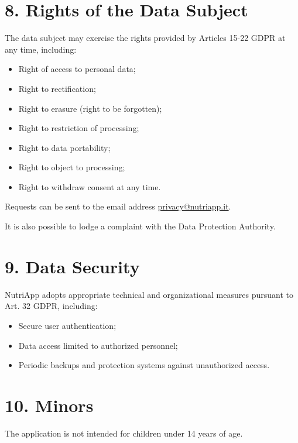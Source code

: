 \documentclass[a4paper,12pt]{article}
\begin{document}
    \section*{8. Rights of the Data Subject}

    The data subject may exercise the rights provided by Articles 15-22 GDPR at any time, including:

    \begin{itemize}
        \item Right of access to personal data;
        \item Right to rectification;
        \item Right to erasure (right to be forgotten);
        \item Right to restriction of processing;
        \item Right to data portability;
        \item Right to object to processing;
        \item Right to withdraw consent at any time.
    \end{itemize}

    Requests can be sent to the email address \href{mailto:privacy@nutriapp.it}{privacy@nutriapp.it}.

    It is also possible to lodge a complaint with the Data Protection Authority.

    \section*{9. Data Security}

    NutriApp adopts appropriate technical and organizational measures pursuant to Art. 32 GDPR, including:

    \begin{itemize}
        \item Secure user authentication;
        \item Data access limited to authorized personnel;
        \item Periodic backups and protection systems against unauthorized access.
    \end{itemize}

    \section*{10. Minors}

    The application is not intended for children under 14 years of age.
\end{document}
